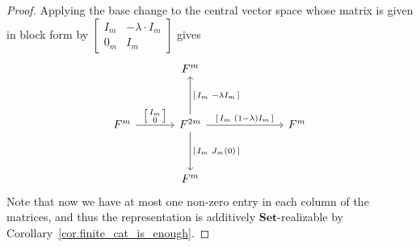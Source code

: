 \documentclass[a4paper]{amsart}
\theoremstyle{plain}
\theoremstyle{definition}
\theoremstyle{remark}
\newcommand{\Set}{\mathbf{Set}}
\begin{document}
\begin{proof}
Applying the base change to the central vector space whose matrix is given in block form by \( \left[ \begin{smallmatrix} I_m & -\lambda\cdot I_m \\ 0_m & I_m \end{smallmatrix} \right] \) gives
\[ \begin{tikzcd}[sep=12mm, ampersand replacement = \&]
  \& F^m \&  \\
  F^m \ar[r, "{\left[ \begin{smallmatrix} I_m \\ 0 \end{smallmatrix} \right]}"] \& F^{2m} \ar[u,swap, "{\left[ \begin{smallmatrix} I_m & - \lambda I_m \end{smallmatrix} \right]}"] \ar[rr, "{\left[ \begin{smallmatrix} I_m & (1 - \lambda) I_m \end{smallmatrix} \right]}"] \ar[d, "{\left[ \begin{smallmatrix} I_m & J_m(0) \end{smallmatrix} \right]}"] \&\& F^m \\
  \& F^m \& \end{tikzcd} \]
Note that now we have at most one non-zero entry in each column of the matrices, and thus the representation is additively \( \Set \)-realizable by Corollary~\ref{cor.finite_cat_is_enough}.
\end{proof}
\end{document}
